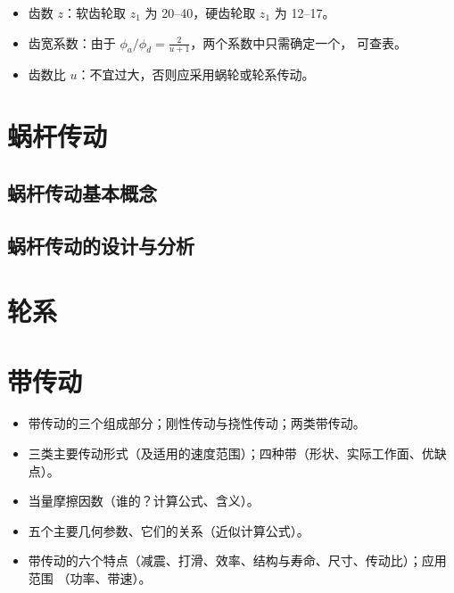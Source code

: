 \documentclass[12pt,a4paper]{article}
\newcommand{\tightlist}{\setlength{\parskip}{0pt}\setlength{\itemsep}{0pt}}
\newcommand{\hint}[1]{\textsf{（#1）}}
\begin{document}
\begin{itemize}
\begin{itemize}
\begin{gather}
{{        \cdot Y_{Sa}}{[\sigma_F]}\right)}\\
        a\geq(u+1)\sqrt[3]{\frac{500KT_1}{\phi_au}\left(\frac{Z_EZ_HZ_\varepsilon
        }{[\sigma_H]}\right)^2}
        \end{gather}
        \item 齿数 $z$：软齿轮取 $z_1$ 为 20--40，硬齿轮取 $z_1$ 为 12--17。
        \item 齿宽系数：由于 $\phi_a/\phi_d=\frac{2}{u+1}$，两个系数中只需确定一个，
        可查表。
        \item 齿数比 $u$：不宜过大，否则应采用蜗轮或轮系传动。
    \end{itemize}
\end{itemize}

\section{蜗杆传动}

\subsection{蜗杆传动基本概念}

\subsection{蜗杆传动的设计与分析}

\section{轮系}

\section{带传动}
\begin{itemize}\tightlist
    \item 带传动的三个组成部分；刚性传动与挠性传动；两类带传动。
    \item 三类主要传动形式\hint{及适用的速度范围}；四种带\hint{形状、实际工作面、优缺点}。
    \item 当量摩擦因数\hint{谁的？计算公式、含义}。
    \item 五个主要几何参数、它们的关系\hint{近似计算公式}。
    \item 带传动的六个特点\hint{减震、打滑、效率、结构与寿命、尺寸、传动比}；应用范围
    \hint{功率、带速}。
\end{itemize}
\end{document}
